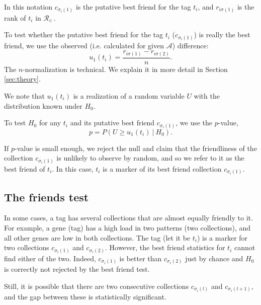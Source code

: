 \documentclass{llncs}
\begin{document}
In this notation $c_{\sigma_i(1)}$ is the putative best friend for the tag $t_i$, and $r_{i\sigma(1)}$ is the rank of $t_i$ in $\mathcal{R}_{i:}$. 

To test whether the putative best friend for the tag $t_i$ ($c_{\sigma_i(1)}$) is really the best friend, we use the observed (i.e. calculated for given $\mathcal{A}$) difference:
\begin{equation}
\label{def:u_1}
u_1(t_i) = \frac{r_{i\sigma(1)} -  r_{i\sigma(2)}}{n}.
\end{equation}
The $n$-normalization is technical. We explain it in more detail in Section \ref{sec:theory}.

We note that $u_1(t_i)$ is a realization of a random variable $U$ with the distribution known under $H_0$.


To test $H_0$ for any $t_i$ and its putative best friend $c_{\sigma_{i}(1)}$, we use the $p$-value,
\[
p = P\left(U \ge u_1(t_i)~|~H_0\right). 
\]

If $p$-value is small enough, we reject the null and claim that the friendliness of the collection $c_{\sigma_{i}(1)}$ is unlikely to observe by random, and so we refer to it as the best friend of $t_i$. In this case, $t_i$ is a marker of its best friend collection $c_{\sigma_{i}(1)}$.

\subsection{The friends test}
\label{sec:friends_test}

In some cases, a tag has several collections that are almost equally friendly to it. 
For example, a gene (tag) has a high load in two patterns (two collections), and all other genes are low in both collections. The tag (let it be $t_i$) is a marker for two collections $c_{\sigma_{i}(1)}$ and $c_{\sigma_{i}(2)}$. However, the best friend statistics for $t_i$ cannot find either of the two. 
Indeed, $c_{\sigma_{i}(1)}$ is better than $c_{\sigma_{i}(2)}$ just by chance and $H_0$ is correctly not rejected by the best friend test.

Still, it is possible that there are two consecutive collections $c_{\sigma_i(l)}$ and $c_{\sigma_i(l+1)}$, and the gap between these is statistically significant.
\end{document}
